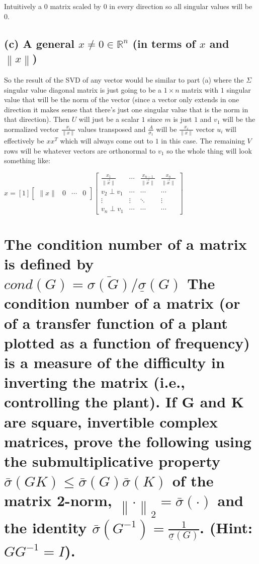 \documentclass[12pt, letterpaper]{article}
\begin{document}
Intuitively a $0$ matrix scaled by $0$ in every direction so all singular values will be $0$.

\subsection*{(c) A general $x \neq 0 \in \mathbb{R}^n$ (in terms of $x$ and $\left\lVert x \right\lVert$)}

So the result of the SVD of any vector would be similar to part (a) where the $\Sigma$ singular value diagonal matrix is just going to be a $1 \times n$ matrix with $1$ singular value that will be the norm of the vector (since a vector only extends in one direction it makes sense that there's just one singular value that is the norm in that direction). Then $U$ will just be a scalar $1$ since $m$ is just $1$ and $v_1$ will be the normalized vector $\frac{x_i}{\left\lVert x \right\lVert}$ values
transposed and $\frac{A}{\sigma_1}$ will be $\frac{x_i}{\|x\|}$ vector $u_i$ will effectively be $xx^T$ which will always come out to $1$ in this case. The remaining $V$ rows will be whatever vectors are orthonormal to $v_1$ so the whole thing will look something like:

$x = \left[ 1 \right] \left[ \begin{array}{cccc} \| x \| & 0 & \cdots & 0 \end{array} \right] \left[ \begin{array}{cccc} \frac{x_1}{\|\vec{x}\|} & \cdots & \frac{x_{n-1}}{\|\vec{x}\|} & \frac{x_n}{\|\vec{x}\|} \\ v_2 \perp v_1 & \cdots & \cdots & \cdots \\ \vdots & \vdots & \ddots & \vdots \\ v_n \perp v_1 & \cdots & \cdots & \cdots \end{array} \right]$

\section{The condition number of a matrix is defined by
$ cond(G) = \bar{\sigma(G)}/\underline{\sigma}(G)$
The condition number of a matrix (or of a transfer function of a plant plotted as a function
of frequency) is a measure of the difficulty in inverting the matrix (i.e., controlling the plant).
If G and K are square, invertible complex matrices, prove the following using the submultiplicative 
property $\bar{\sigma}(GK) \leq \bar{\sigma}(G)\bar{\sigma}(K)$ of the matrix 2-norm, $\left\lVert \cdot \right\lVert_2 = \bar{\sigma}(\cdot)$ and the identity
$\bar{\sigma}(G^{-1}) = \frac{1}{\underline{\sigma}(G)}$. (Hint: $GG^{-1} = I$).
}
\end{document}
